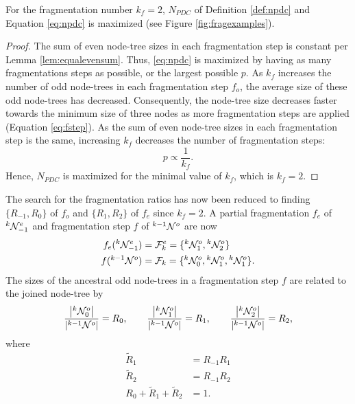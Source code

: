 \begin{theorem}\label{the:fragnumber}
  For the fragmentation number $k_f=2$, $N_{PDC}$ of Definition \ref{def:npdc} and Equation \eqref{eq:npdc} is maximized (see Figure \ref{fig:fragexamples}). 
\end{theorem}
\begin{proof}
  The sum of even node-tree sizes in each fragmentation step is constant per Lemma \ref{lem:equalevensum}. Thus, \eqref{eq:npdc} is maximized by having as many fragmentations steps as possible, or the largest possible $p$.  As $k_f$ increases the number of odd node-trees in each fragmentation step $f_o$, the average size of these odd node-trees has decreased. Consequently, the node-tree size decreases faster towards the minimum size of three nodes as more fragmentation steps are applied (Equation \eqref{eq:fstep}). As the sum of even node-tree sizes in each fragmentation step is the same, increasing $k_f$ decreases the number of fragmentation steps: 
  \begin{equation}
    p \propto \frac{1}{k_f}.
  \end{equation}
   Hence, $N_{PDC}$ is maximized for the minimal value of $k_f$, which is $k_f = 2$.
\end{proof}



The search for the fragmentation ratios has now been reduced to finding $\{R_{-1}, R_0\}$ of $f_o$ and $\{R_1, R_2\}$ of $f_e$ since $k_f = 2$. A partial fragmentation $f_e$ of ${}^{k}\mathcal{N}^e_{-1}$ and fragmentation step $f$ of ${}^{k-1}\mathcal{N}^o$ are now
\begin{align}
   f_e({}^{k}\mathcal{N}^e_{-1})  &= \mathcal{F}^e_k  =\{{}^{k}\mathcal{N}^{o}_1,{}^{k}\mathcal{N}^o_2\} \label{eq:newpfe} \\
   f({}^{k-1}\mathcal{N}^o)       &= \mathcal{F}_k    = \{{}^{k}\mathcal{N}^o_0, {}^{k}\mathcal{N}^o_1, {}^{k}\mathcal{N}^o_1\}. \label{eq:newfstep}
\end{align}
The sizes of the ancestral odd node-trees in a fragmentation step $f$ are related to the joined node-tree by
\begin{equation}
  \frac{\abs{{}^{k}\mathcal{N}^o_0}}{\abs{{}^{k-1}\mathcal{N}^o}} = R_0, \hspace{2em}
  \frac{\abs{{}^{k}\mathcal{N}^o_1}}{\abs{{}^{k-1}\mathcal{N}^o}} = R_1, \hspace{2em}
  \frac{\abs{{}^{k}\mathcal{N}^o_2}}{\abs{{}^{k-1}\mathcal{N}^o}} = R_2,
\end{equation}
where
\begin{align}
  \nonumber  \tilde{R}_1 &= R_{-1}R_1\\
             \tilde{R}_2 &= R_{-1}R_2 \label{eq:bigratios} \\
  \nonumber  R_0 + \tilde{R}_1 + \tilde{R}_2 &= 1. 
\end{align}

